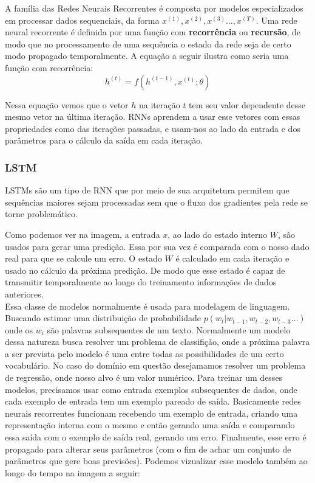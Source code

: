 A família das Redes Neurais Recorrentes é composta por modelos especializados
em processar dados sequenciais, da forma $x^{(1)},x^{(2)} ,x^{(3)}\dots ,x^{(T)}$. Uma rede neural recorrente é definida por uma função com
\textbf{recorrência} ou \textbf{recursão}, de modo que no processamento de uma
sequência o estado da rede seja de certo modo propagado temporalmente. A equação
a seguir ilustra como seria uma função com recorrência: \\

\[h^{(t)} = f(h^{(t-1)},x^{(t)};\theta)\]

Nessa equação vemos que o vetor $h$ na iteração $t$ tem seu valor dependente
desse mesmo vetor na última iteração. RNNs aprendem a usar esse vetores com
essas propriedades como
 das iterações passadas, e usam-nos ao lado da entrada e dos
parâmetros para o cálculo da saída em cada iteração.

\subsubsection{LSTM}

LSTMs são um tipo de RNN que por meio de sua arquitetura permitem que sequências
maiores sejam processadas sem que o fluxo dos gradientes pela rede se torne
problemático. 



Como podemos ver na imagem, a entrada $x$, ao lado do estado interno $W$, são usados para gerar uma predição. Essa por sua vez é comparada com o nosso dado real para que se calcule um erro. O estado $W$ é calculado em cada iteração e usado no cálculo da próxima predição. De modo que esse estado é capaz de transmitir temporalmente ao longo do treinamento informações de dados anteriores.
\\

Essa classe de modelos normalmente é usada para modelagem de linguagem. Buscando estimar uma distribuição de probabilidade $p(w_t | w_{t-1},w_{t-2},w_{t-3} \dots ) $ onde os $w_i$ são palavras subsequentes de um texto. Normalmente um modelo dessa natureza busca resolver um problema de classifição, onde a próxima palavra a ser prevista pelo modelo é uma entre todas as possibilidades de um certo vocabulário. No caso do domínio em questão desejamamos resolver um problema de regressão, onde nosso alvo é um valor numérico. Para treinar um desses modelos, precisamos usar como entrada exemplos subsequentes de dados, onde cada exemplo de entrada tem um exemplo pareado de saída. Basicamente redes neurais recorrentes funcionam recebendo um exemplo de entrada, criando uma representação interna com o mesmo e então gerando uma saída e comparando essa saída com o exemplo de saída real, gerando um erro. Finalmente, esse erro é propagado para alterar seus parâmetros (com o fim de achar um conjunto de parâmetros que gere boas previsões). Podemos vizualizar esse modelo também ao longo do tempo na imagem a seguir:


